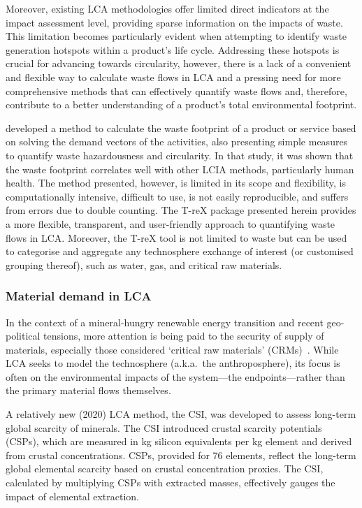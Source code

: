 Moreover, existing LCA methodologies offer limited direct indicators at the impact assessment level, providing sparse information on the impacts of waste. This limitation becomes particularly evident when attempting to identify waste generation hotspots within a product's life cycle. Addressing these hotspots is crucial for advancing towards circularity, however,  there is a lack of a convenient and flexible way to calculate waste flows in LCA and a pressing need for more comprehensive methods that can effectively quantify waste flows and, therefore, contribute to a better understanding of a product's total environmental footprint. 


\cite{laurenti2023wastefootprint} developed a method to calculate the waste footprint of a product or service based on solving the demand vectors of the activities, also presenting simple measures to quantify waste hazardousness and circularity. In that study, it was shown that the waste footprint correlates well with other LCIA methods, particularly human health. The method presented, however, is limited in its scope and flexibility, is computationally intensive, difficult to use, is not easily reproducible, and suffers from errors due to double counting. The T-reX package presented herein provides a more flexible, transparent, and user-friendly approach to quantifying waste flows in LCA. Moreover, the T-reX tool is not limited to waste but can be used to categorise and aggregate any technosphere exchange of interest (or customised grouping thereof), such as water, gas, and critical raw materials. 

\subsubsection{Material demand in LCA}

In the context of a mineral-hungry renewable energy transition and recent geo-political tensions, more attention is being paid to the security of supply of materials, especially those considered `critical raw materials' (CRMs)~\citep{eu2023crmstudy,hool2023crm,mancini2013supplysecurity,jrc2023supplychain,hartley2024cepolitics,salviulo2021supplychain}. While LCA seeks to model the technosphere (a.k.a.\ the anthroposphere), its focus is often on the environmental impacts of the system---the endpoints---rather than the primary material flows themselves. 

A relatively new (2020) LCA method, the CSI, was developed to assess long-term global scarcity of minerals. The CSI introduced crustal scarcity potentials (CSPs), which are measured in kg silicon equivalents per kg element and derived from crustal concentrations. CSPs, provided for 76 elements, reflect the long-term global elemental scarcity based on crustal concentration proxies. The CSI, calculated by multiplying CSPs with extracted masses, effectively gauges the impact of elemental extraction. 

